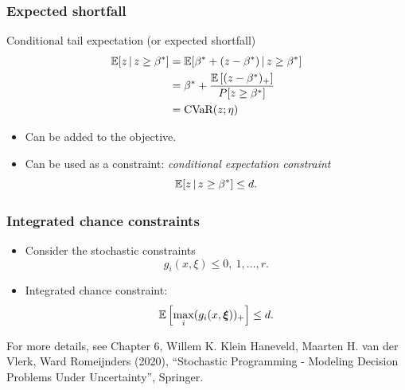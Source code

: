 \documentclass{beamer}
\def\bxi{\boldsymbol\xi}
\begin{document}
\begin{frame}
\frametitle{Expected shortfall}

Conditional tail expectation (or expected shortfall)
\begin{align*}
{\mathbb{E}}[z \,|\, z \geq \beta^* ]
&= {\mathbb{E}}[\beta^* + (z - \beta^*) \,|\, z \geq \beta^*] \\
&= \beta^* + \frac{{\mathbb{E}}\left[(z - \beta^*)_+\right]}{P[z \geq \beta^*]} \\
&= \text{CVaR}(z; \eta)
\end{align*}

\begin{itemize}
	\item Can be added to the objective.
	\item Can be used as a constraint: \textit{conditional expectation constraint}
	$$
	{\mathbb{E}}[z \,|\, z \geq \beta^*] \leq d.
	$$
\end{itemize}

\end{frame}

\begin{frame}
\frametitle{Integrated chance constraints}

\begin{itemize}
\item 
Consider the stochastic constraints
$$
g_i(x, \xi) \leq 0,\ 1,\ldots, r.
$$
\item
Integrated chance constraint:
$$
\EE \left[ \max_i (g_i(x,\bxi))_+ \right] \leq d.
$$
\end{itemize}

\mbox{}

For more details, see Chapter 6, Willem K. Klein Haneveld, Maarten H. van der Vlerk, Ward Romeijnders (2020), ``Stochastic Programming - Modeling Decision Problems Under Uncertainty'', Springer.
\end{frame}

\end{document}
